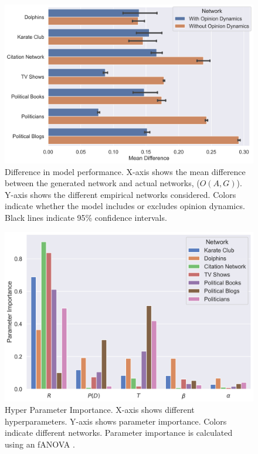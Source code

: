 \documentclass{article}
\begin{document}
\begin{figure}[H]
    \centering
    \includegraphics[width=.8\linewidth]{../plots/overall/Model_Evaluation.png}
  \caption{Difference in model performance. X-axis shows the mean difference between the generated network and actual networks, ($O(A, G)$). Y-axis shows the different empirical networks considered. Colors indicate whether the model includes or excludes opinion dynamics. Black lines indicate 95\% confidence intervals.}
  \label{fig:sfig1}
\end{figure}

\begin{figure}[H]
    \centering
    \includegraphics[width=.8\linewidth]{../plots/overall/Parameter_Importance.png}
  \caption{Hyper Parameter Importance. X-axis shows different hyperparameters. Y-axis shows parameter importance. Colors indicate different networks. Parameter importance is calculated using an fANOVA \protect\cite{hutter2014efficient}.}
  \label{fig:sfig1}
\end{figure}
\end{document}
